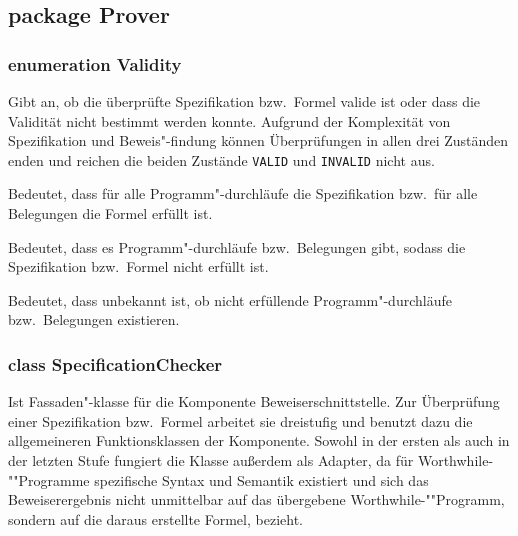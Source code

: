 \subsection{package Prover}%

\subsubsection{enumeration Validity}%

Gibt an, ob die überprüfte Spezifikation bzw.\ Formel valide ist oder
dass die Validität nicht bestimmt werden konnte. Aufgrund der
Komplexität von Spezifikation und Beweis"-findung können Überprüfungen
in allen drei Zuständen enden und reichen die beiden Zustände
\texttt{VALID} und \texttt{INVALID} nicht aus.%

\begin{description}%

    Bedeutet, dass für alle Programm"-durchläufe die Spezifikation
    bzw.\ für alle Belegungen die Formel erfüllt ist.%


    Bedeutet, dass es Programm"-durchläufe bzw.\ Belegungen gibt,
    sodass die Spezifikation bzw.\ Formel nicht erfüllt ist.%


    Bedeutet, dass unbekannt ist, ob nicht erfüllende
    Programm"-durchläufe bzw.\ Belegungen existieren.%

\end{description}%

\subsubsection{class SpecificationChecker}%

Ist Fassaden"-klasse für die Komponente Beweiserschnittstelle. Zur
Überprüfung einer Spezifikation bzw.\ Formel arbeitet sie dreistufig
und benutzt dazu die allgemeineren Funktionsklassen der Komponente.
Sowohl in der ersten als auch in der letzten Stufe fungiert die Klasse
außerdem als Adapter, da für Worthwhile-""Programme spezifische Syntax
und Semantik existiert und sich das Beweiserergebnis nicht unmittelbar
auf das übergebene Worthwhile-""Programm, sondern auf die daraus
erstellte Formel, bezieht.%

